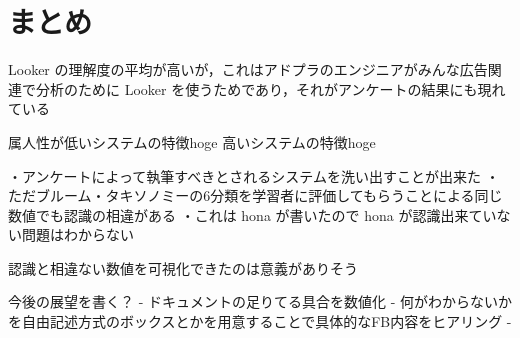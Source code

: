 \section{まとめ}
Looker の理解度の平均が高いが，これはアドプラのエンジニアがみんな広告関連で分析のために Looker を使うためであり，それがアンケートの結果にも現れている



属人性が低いシステムの特徴hoge
高いシステムの特徴hoge

・アンケートによって執筆すべきとされるシステムを洗い出すことが出来た
・ただブルーム・タキソノミーの6分類を学習者に評価してもらうことによる同じ数値でも認識の相違がある
・これは hona が書いたので hona が認識出来ていない問題はわからない


認識と相違ない数値を可視化できたのは意義がありそう


今後の展望を書く？
- ドキュメントの足りてる具合を数値化
- 何がわからないかを自由記述方式のボックスとかを用意することで具体的なFB内容をヒアリング
- 
